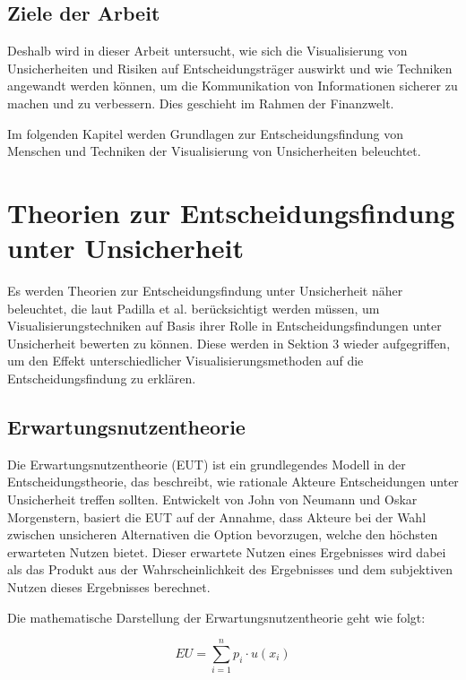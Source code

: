 \subsection{Ziele der Arbeit}

Deshalb wird in dieser Arbeit untersucht, wie sich die Visualisierung von Unsicherheiten und Risiken auf Entscheidungsträger auswirkt und wie Techniken angewandt werden können, um die Kommunikation von Informationen sicherer zu machen und zu verbessern. Dies geschieht im Rahmen der Finanzwelt.

Im folgenden Kapitel werden Grundlagen zur Entscheidungsfindung von Menschen und Techniken der Visualisierung von Unsicherheiten beleuchtet.

\section{Theorien zur Entscheidungsfindung unter Unsicherheit}

Es werden Theorien zur Entscheidungsfindung unter Unsicherheit näher beleuchtet, die laut Padilla et al. \cite{VisualizationPsychology2023} berücksichtigt werden müssen, um Visualisierungstechniken auf Basis ihrer Rolle in Entscheidungsfindungen unter Unsicherheit bewerten zu können. Diese werden in Sektion 3 wieder aufgegriffen, um den Effekt unterschiedlicher Visualisierungsmethoden auf die Entscheidungsfindung zu erklären.

\subsection{Erwartungsnutzentheorie}

Die Erwartungsnutzentheorie (EUT) ist ein grundlegendes Modell in der Entscheidungstheorie, das beschreibt, wie rationale Akteure Entscheidungen unter Unsicherheit treffen sollten. Entwickelt von John von Neumann und Oskar Morgenstern, basiert die EUT auf der Annahme, dass Akteure bei der Wahl zwischen unsicheren Alternativen die Option bevorzugen, welche den höchsten erwarteten Nutzen bietet. Dieser erwartete Nutzen eines Ergebnisses wird dabei als das Produkt aus der Wahrscheinlichkeit des Ergebnisses und dem subjektiven Nutzen dieses Ergebnisses berechnet.

Die mathematische Darstellung der Erwartungsnutzentheorie geht wie folgt:

\begin{equation}
EU = \sum_{i=1}^{n} p_i \cdot u(x_i)
\end{equation}

